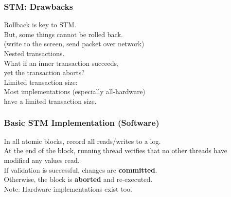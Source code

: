 \begin{frame}
  \frametitle{STM: Drawbacks}


    Rollback is key to STM. \\
     \qquad But, some things cannot be rolled back. \\
     \qquad (write to the screen, send packet over network)\\[1em]

    Nested transactions. \\
     \qquad What if an inner transaction succeeds, \\ yet the
      transaction aborts? \\[1em]

    Limited transaction size: \\
 \qquad Most implementations (especially
    all-hardware) \\ have a limited transaction size.

\end{frame}

\begin{frame}
  \frametitle{Basic STM Implementation (Software)}


    In all atomic blocks, record all reads/writes to a log.\\[1em]
    At the end of the block, running thread verifies that no other threads
      have modified any values read.\\[1em]
    If validation is successful, changes are {\bf committed}.\\
    Otherwise, the block is {\bf aborted} and re-executed.\\[2em]

  Note: Hardware implementations exist too.



\end{frame}

